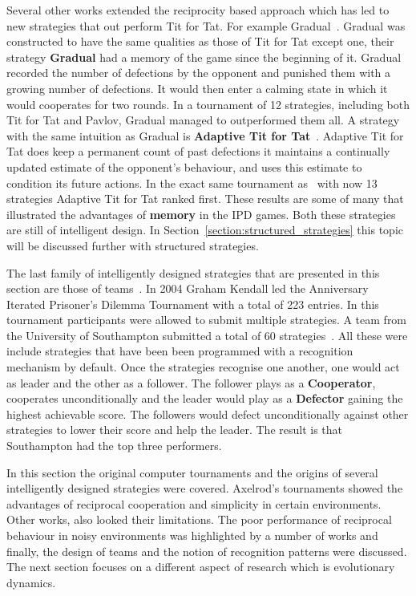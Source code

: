 \documentclass{article}
\theoremstyle{definition}
\begin{document}
Several other works extended the reciprocity based approach which has led to new
strategies that out perform Tit for Tat. For example
Gradual~\cite{Beaufils1997}. Gradual was constructed to have the same qualities
as those of Tit for Tat except one, their strategy \textbf{Gradual} had a memory
of the game since the beginning of it. Gradual recorded the number of defections
by the opponent and punished them with a growing number of defections. It would
then enter a calming state in which it would cooperates for two rounds. In a
tournament of 12 strategies, including both Tit for Tat and Pavlov, Gradual
managed to outperformed them all. A strategy with the same intuition as Gradual
is \textbf{Adaptive Tit for Tat}~\cite{tzafestas-2000a}. Adaptive Tit for Tat
does keep a permanent count of past defections it maintains a continually
updated estimate of the opponent’s behaviour, and uses this estimate to
condition its future actions. In the exact same tournament
as~\cite{Beaufils1997} with now 13 strategies Adaptive Tit for Tat ranked first.
These results are some of many that illustrated the advantages of
\textbf{memory} in the IPD games. Both these
strategies are still of intelligent design. In
Section~\ref{section:structured_strategies} this topic will be discussed further
with structured strategies.

The last family of intelligently designed strategies that are presented in this
section are those of teams~\cite{J.P.Delahaye1993Lp, J.P.Delahaye1995LIeP,
A.Rogers2007Ctpw}. In 2004 Graham Kendall led the Anniversary Iterated
Prisoner's Dilemma Tournament with a total of 223 entries. In this tournament
participants were allowed to submit multiple strategies. A team from the
University of Southampton submitted a total of 60
strategies~\cite{A.Rogers2007Ctpw}. All these were include strategies that have
been been programmed with a recognition mechanism by default. Once the
strategies recognise one another, one would act as leader and the other as a
follower. The follower plays as a \textbf{Cooperator}, cooperates
unconditionally and the leader would play as a \textbf{Defector} gaining the
highest achievable score. The followers would defect unconditionally against
other strategies to lower their score and help the leader. The result is that
Southampton had the top three performers.

In this section the original computer tournaments and the origins of several
intelligently designed strategies were covered. Axelrod's tournaments showed the
advantages of reciprocal cooperation and simplicity in certain environments.
Other works, also looked their limitations. The poor performance of reciprocal
behaviour in noisy environments was highlighted by a number of works and
finally, the design of teams and the notion of recognition patterns were
discussed. The next section focuses on a different aspect of research which is
evolutionary dynamics.
\end{document}
